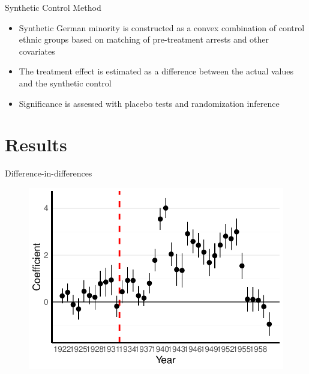 \documentclass[11pt]{beamer}
\begin{document}
\begin{frame}{Synthetic Control Method}
\begin{itemize}
    \item Synthetic German minority is constructed as a convex combination of control ethnic groups based on matching of pre-treatment arrests and other covariates
    \item The treatment effect is estimated as a difference between the actual
     values and the synthetic control
    \item Significance is assessed with placebo tests and randomization inference
\end{itemize}
\end{frame}
{
\section{Results}
}
\begin{frame}{Difference-in-differences}
 \begin{figure}[h]
\centering
\includegraphics[width=\textwidth]{fmla_pred_full_imp_date_no_trends_geopol_cr2.pdf}
\label{fig:did_effets}
\end{figure}
\end{frame}
\end{document}
